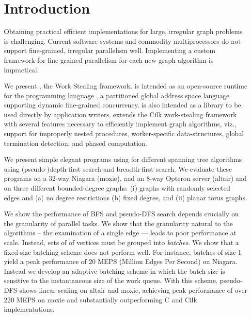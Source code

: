 
\section{Introduction}
\label{s:intr}\label{sec:intro}

Obtaining practical efficient implementations for large, irregular
graph problems is challenging. Current software systems and commodity
multiprocessors do not support fine-grained, irregular parallelism
well. Implementing a custom framework for fine-grained parallelism for
each new graph algorithm is impractical.

We present \XWS{}, the \Xten{} Work Stealing framework.
\XWS{} is intended as an open-source runtime for the programming
language \Xten{}, a partitioned global address space language
supporting dynamic fine-grained concurrency.  \XWS{} is also intended
as a library to be used directly by application writers. \XWS{}
extends the Cilk work-stealing framework with several features
necessary to efficiently implement graph algorithms, viz., support for
improperly nested procedures, worker-specific data-structures, global
termination detection, and phased computation.

We present simple elegant programs using \XWS{} for different spanning
tree algorithms using (pseudo-)depth-first search and breadth-first
search.  We evaluate these programs on a 32-way Niagara (moxie), and
an 8-way Opteron server (altair) and on three different bounded-degree
graphs: (i) graphs with randomly selected edges and (a) no degree
restrictions (b) fixed degree, and (ii) planar torus graphs.

We show the performance of BFS and pseudo-DFS search depends crucially
on the granularity of parallel tasks. We show that the granularity
natural to the algorithms -- the examination of a single edge ---
leads to poor performance at scale. Instead, sets of of vertices must
be grouped into {\em batches}. We show that a fixed-size batching
scheme does not perform well. For instance, batches of size $1$ yield
a peak performance of 20 MEPS (Million Edges Per Second) on Niagara.
Instead we develop an adaptive batching scheme in which the batch
size is sensitive to the instantaneous size of the work queue.  With
this scheme, pseudo-DFS shows linear scaling on altair and moxie,
achieving peak performance of over 220 MEPS on moxie and substantially
outperforming C and Cilk implementations.


